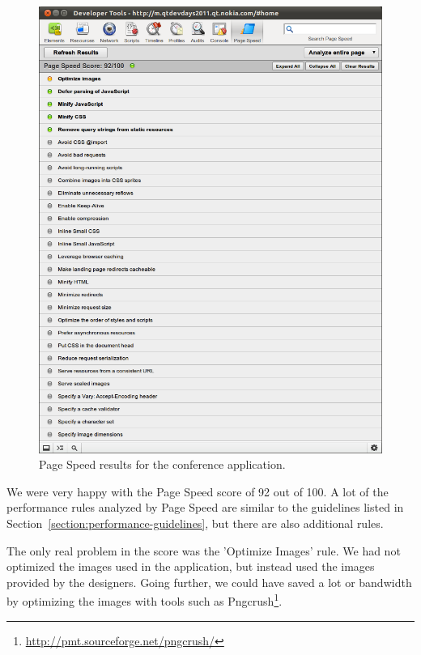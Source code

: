 \begin{figure}[ht]
  \begin{center}
    \includegraphics[width=\textwidth]{images/devdays-pagespeed.png}
    \caption{Page Speed results for the conference application.}
    \label{figure:devdays-pagespeed.png}
  \end{center}
\end{figure}

We were very happy with the Page Speed score of 92 out of 100. A lot
of the performance rules analyzed by Page Speed are similar to the
guidelines listed in Section~\ref{section:performance-guidelines}, but
there are also additional rules.

The only real problem in the score was the 'Optimize Images' rule. We
had not optimized the images used in the application, but instead used
the images provided by the designers. Going further, we could have
saved a lot or bandwidth by optimizing the images with tools such as
Pngcrush\footnote{\url{http://pmt.sourceforge.net/pngcrush/}}.

